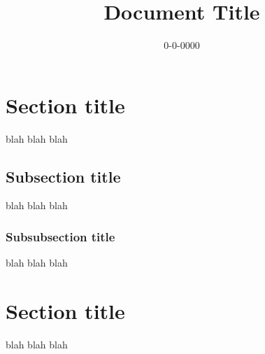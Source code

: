 \documentclass{article}
\title{Document Title}
\date{0-0-0000}
\begin{document}
\maketitle
\newpage

\section{Section title}

blah blah blah

\subsection{Subsection title}

blah blah blah

\subsubsection{Subsubsection title}

blah blah blah

\section{Section title}

blah blah blah
\end{document}
